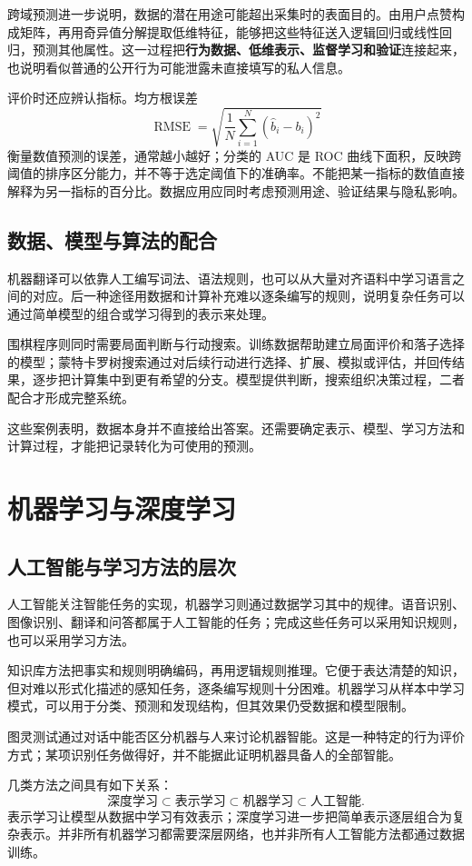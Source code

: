 \documentclass[UTF8,fontset=fandol,a4paper,12pt]{ctexart}
\theoremstyle{definition}
\begin{document}
跨域预测进一步说明，数据的潜在用途可能超出采集时的表面目的。由用户点赞构成矩阵，再用奇异值分解提取低维特征，能够把这些特征送入逻辑回归或线性回归，预测其他属性。这一过程把\textbf{行为数据、低维表示、监督学习和验证}连接起来，也说明看似普通的公开行为可能泄露未直接填写的私人信息。

评价时还应辨认指标。均方根误差
\[
 \operatorname{RMSE}=\sqrt{\frac1N\sum_{i=1}^N(\widehat b_i-b_i)^2}
\]
衡量数值预测的误差，通常越小越好；分类的 AUC 是 ROC 曲线下面积，反映跨阈值的排序区分能力，并不等于选定阈值下的准确率。不能把某一指标的数值直接解释为另一指标的百分比。数据应用应同时考虑预测用途、验证结果与隐私影响。

\subsection{数据、模型与算法的配合}
机器翻译可以依靠人工编写词法、语法规则，也可以从大量对齐语料中学习语言之间的对应。后一种途径用数据和计算补充难以逐条编写的规则，说明复杂任务可以通过简单模型的组合或学习得到的表示来处理。

围棋程序则同时需要局面判断与行动搜索。训练数据帮助建立局面评价和落子选择的模型；蒙特卡罗树搜索通过对后续行动进行选择、扩展、模拟或评估，并回传结果，逐步把计算集中到更有希望的分支。模型提供判断，搜索组织决策过程，二者配合才形成完整系统。

这些案例表明，数据本身并不直接给出答案。还需要确定表示、模型、学习方法和计算过程，才能把记录转化为可使用的预测。

\section{机器学习与深度学习}
\subsection{人工智能与学习方法的层次}
人工智能关注智能任务的实现，机器学习则通过数据学习其中的规律。语音识别、图像识别、翻译和问答都属于人工智能的任务；完成这些任务可以采用知识规则，也可以采用学习方法。

知识库方法把事实和规则明确编码，再用逻辑规则推理。它便于表达清楚的知识，但对难以形式化描述的感知任务，逐条编写规则十分困难。机器学习从样本中学习模式，可以用于分类、预测和发现结构，但其效果仍受数据和模型限制。

图灵测试通过对话中能否区分机器与人来讨论机器智能。这是一种特定的行为评价方式；某项识别任务做得好，并不能据此证明机器具备人的全部智能。

几类方法之间具有如下关系：
\[
 \text{深度学习}\subset\text{表示学习}\subset\text{机器学习}\subset\text{人工智能}.
\]
表示学习让模型从数据中学习有效表示；深度学习进一步把简单表示逐层组合为复杂表示。并非所有机器学习都需要深层网络，也并非所有人工智能方法都通过数据训练。
\end{document}
